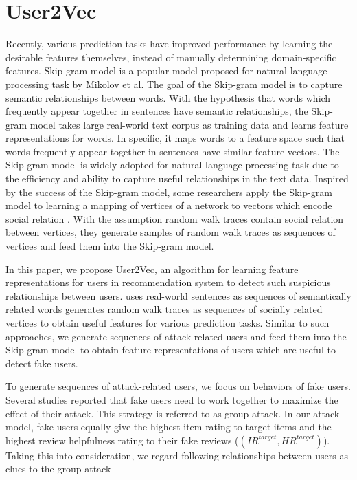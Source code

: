 \documentclass[master,english,final]{kaist-ucs}
\begin{document}
\section{User2Vec}
Recently, various prediction tasks \cite{Word2Vec,NegativeSampling,DeepWalk,Node2Vec} have improved performance by learning the desirable features themselves, instead of manually determining domain-specific features.
Skip-gram model \cite{Word2Vec} is a popular model proposed for natural language processing task by Mikolov et al.
The goal of the Skip-gram model is to capture semantic relationships between words.
With the hypothesis that words which frequently appear together in sentences have semantic relationships, the Skip-gram model takes large real-world text corpus as training data and learns feature representations for words.
In specific, it maps words to a feature space such that words frequently appear together in sentences have similar feature vectors.
The Skip-gram model is widely adopted for natural language processing task due to the efficiency and ability to capture useful relationships in the text data.
Inspired by the success of the Skip-gram model, some researchers apply the Skip-gram model to learning a mapping of vertices of a network to vectors which encode social relation \cite{DeepWalk,Node2Vec}.
With the assumption random walk traces contain social relation between vertices, they generate samples of random walk traces as sequences of vertices and feed them into the Skip-gram model.

In this paper, we propose User2Vec, an algorithm for learning feature representations for users in recommendation system to detect such suspicious relationships between users.
\cite{Word2Vec} uses real-world sentences as sequences of semantically related words \cite{DeepWalk,Node2Vec} generates random walk traces as sequences of socially related vertices to obtain useful features for various prediction tasks.
Similar to such approaches, we generate sequences of attack-related users and feed them into the Skip-gram model to obtain feature representations of users which are useful to detect fake users.

To generate sequences of attack-related users, we focus on behaviors of fake users.
Several studies \cite{LiesAndPropaganda,UnsupervisedShilling} reported that fake users need to work together to maximize the effect of their attack.
This strategy is referred to as group attack.
In our attack model, fake users equally give the highest item rating to target items and the highest review helpfulness rating to their fake reviews ($(IR^{target},HR^{target})$).
Taking this into consideration, we regard following relationships between users as clues to the group attack
\end{document}
